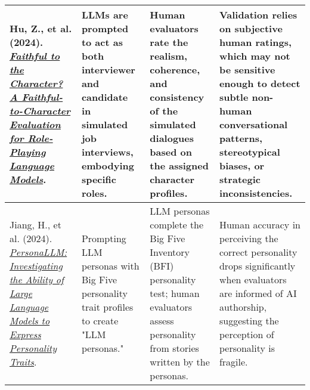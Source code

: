 {\begin{longtable}{| L{4.5cm} | L{3.5cm} | L{3.5cm} | L{3.5cm} |}
\\\hline
Hu, Z., et al. (2024). \href{https://arxiv.org/abs/2402.04049}{\textit{Faithful to the Character? A Faithful-to-Character Evaluation for Role-Playing Language Models}}. & LLMs are prompted to act as both interviewer and candidate in simulated job interviews, embodying specific roles. & Human evaluators rate the realism, coherence, and consistency of the simulated dialogues based on the assigned character profiles. & Validation relies on subjective human ratings, which may not be sensitive enough to detect subtle non-human conversational patterns, stereotypical biases, or strategic inconsistencies.
\\\hline
Jiang, H., et al. (2024). \href{https://aclanthology.org/2024.findings-naacl.229/}{\textit{PersonaLLM: Investigating the Ability of Large Language Models to Express Personality Traits}}. & Prompting LLM personas with Big Five personality trait profiles to create "LLM personas." & LLM personas complete the Big Five Inventory (BFI) personality test; human evaluators assess personality from stories written by the personas. & Human accuracy in perceiving the correct personality drops significantly when evaluators are informed of AI authorship, suggesting the perception of personality is fragile.
\\\hline

\end{longtable}
} %